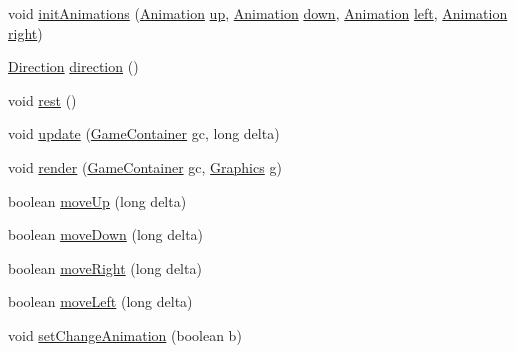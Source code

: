 \begin{DoxyCompactItemize}
\item 
void \mbox{\hyperlink{classentities_1_1_animated_sprite_entity_a29fd02bb8210a0efa459549527f2ff7a}{init\+Animations}} (\mbox{\hyperlink{classorg_1_1newdawn_1_1slick_1_1_animation}{Animation}} \mbox{\hyperlink{classentities_1_1_animated_sprite_entity_aa3f0c36879bc4afe3d25f744f357b5b6}{up}}, \mbox{\hyperlink{classorg_1_1newdawn_1_1slick_1_1_animation}{Animation}} \mbox{\hyperlink{classentities_1_1_animated_sprite_entity_a770f7c34cd976991f59b6701d670d974}{down}}, \mbox{\hyperlink{classorg_1_1newdawn_1_1slick_1_1_animation}{Animation}} \mbox{\hyperlink{classentities_1_1_animated_sprite_entity_ae706cd48f3aeb5cac587490c5317553d}{left}}, \mbox{\hyperlink{classorg_1_1newdawn_1_1slick_1_1_animation}{Animation}} \mbox{\hyperlink{classentities_1_1_animated_sprite_entity_acae197ec16525f140d7285eec19e18da}{right}})
\item 
\mbox{\hyperlink{enumentities_1_1_direction}{Direction}} \mbox{\hyperlink{classentities_1_1_animated_sprite_entity_a74c87e881f72316f17e8e1a5e8e0fc8d}{direction}} ()
\item 
void \mbox{\hyperlink{classentities_1_1_animated_sprite_entity_a968525f6ed17d7c57c1237dbc077b29d}{rest}} ()
\item 
void \mbox{\hyperlink{classentities_1_1_animated_sprite_entity_a6d6fde757faa1c53b41f9cd7b1494c88}{update}} (\mbox{\hyperlink{classorg_1_1newdawn_1_1slick_1_1_game_container}{Game\+Container}} gc, long delta)
\item 
void \mbox{\hyperlink{classentities_1_1_animated_sprite_entity_a5b365fae190a30e44ef7396da665f9b7}{render}} (\mbox{\hyperlink{classorg_1_1newdawn_1_1slick_1_1_game_container}{Game\+Container}} gc, \mbox{\hyperlink{classorg_1_1newdawn_1_1slick_1_1_graphics}{Graphics}} g)
\item 
boolean \mbox{\hyperlink{classentities_1_1_animated_sprite_entity_ad55c31998d2dac72b458d5428776fc57}{move\+Up}} (long delta)
\item 
boolean \mbox{\hyperlink{classentities_1_1_animated_sprite_entity_a818215ee10658afedf17eef3b002d7c1}{move\+Down}} (long delta)
\item 
boolean \mbox{\hyperlink{classentities_1_1_animated_sprite_entity_a2c5313110fec88112214016c9e5435a7}{move\+Right}} (long delta)
\item 
boolean \mbox{\hyperlink{classentities_1_1_animated_sprite_entity_a3a0ea9690a4518899e74d92882952c8c}{move\+Left}} (long delta)
\item 
void \mbox{\hyperlink{classentities_1_1_animated_sprite_entity_a8732d4ec11ec60bf0a1f91811f16b67b}{set\+Change\+Animation}} (boolean b)

\end{DoxyCompactItemize}
